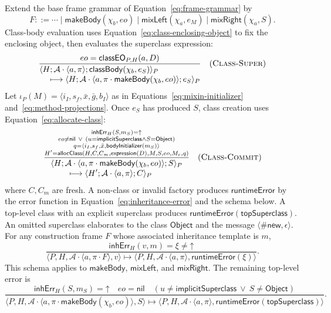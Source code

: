 \documentclass[11pt]{article}
\numberwithin{equation}{section}
\newcommand{\kw}[1]{\ensuremath{\mathsf{#1}}}
\newcommand{\undef}{\mathord{\uparrow}}
\newcommand{\nil}{\kw{nil}}
\newcommand{\Object}{\kw{Object}}
\newcommand{\rulelabel}[1]{\textsc{#1}}
\begin{document}
Extend the base frame grammar of Equation~\eqref{eq:frame-grammar} by
\begin{equation}\label{eq:class-construction-frames}
 F ::= \cdots\mid\kw{makeBody}(\chi_b,eo)
       \mid\kw{mixLeft}(\chi_a,e_M)
       \mid\kw{mixRight}(\chi_a,S).
\end{equation}
Class-body evaluation uses Equation~\eqref{eq:class-enclosing-object} to fix the
enclosing object, then evaluates the superclass expression:
\[
\dfrac{eo=\mathsf{classEO}_{P,H}(a,D)}
 {\begin{aligned}
  &\langle H;\mathcal A\cdot\langle a,\pi\rangle;
       \kw{classBody}(\chi_b,e_S)\rangle_P\\[-1mm]
  &\quad\longmapsto
   \langle H;\mathcal A\cdot\langle a,
       \pi\cdot\kw{makeBody}(\chi_b,eo)\rangle;e_S\rangle_P
 \end{aligned}}
\quad(\rulelabel{Class-Super})
\]
Let $\iota_P(M)=\langle i_I,s_f,\bar x,\bar g,b_I\rangle$ as in
Equations~\eqref{eq:mixin-initializer} and~\eqref{eq:method-projections}.  Once $e_S$
has produced $S$, class creation uses Equation~\eqref{eq:allocate-class}:
\[
\dfrac{\substack{\mathsf{inhErr}_H(S,m_S)=\undef\\
       eo\ne\nil\ \lor\ (u=\kw{implicitSuperclass}\land S=\Object)\\
       q=\langle i_I,s_f,\bar x,\kw{bodyInitializer}(m_S)\rangle\\
       H'=\mathsf{allocClass}(H,C,C_m,\kw{expression}(D),M,S,eo,M_c,q)}}
 {\begin{aligned}
  &\langle H;\mathcal A\cdot\langle a,
       \pi\cdot\kw{makeBody}(\chi_b,eo)\rangle;S\rangle_P\\[-1mm]
  &\qquad\longmapsto
   \langle H';\mathcal A\cdot\langle a,\pi\rangle;C\rangle_P
 \end{aligned}}
\quad(\rulelabel{Class-Commit})
\]
where $C,C_m$ are fresh.  A non-class or invalid factory produces
$\kw{runtimeError}$ by the error function in
Equation~\eqref{eq:inheritance-error} and the schema below.  A top-level class with an
explicit superclass produces $\kw{runtimeError}(\kw{topSuperclass})$.
An omitted superclass elaborates to the class \Object{} and the message
$\langle\#\kw{new},\epsilon\rangle$.
For any construction frame $F$ whose associated inheritance template is $m$,
\begin{equation}\label{eq:inheritance-error-step}
\dfrac{\mathsf{inhErr}_H(v,m)=\xi\ne\undef}
 {\langle P,H,\mathcal A\cdot\langle a,\pi\cdot F\rangle,v\rangle
  \longmapsto
  \langle P,H,\mathcal A\cdot\langle a,\pi\rangle,
       \kw{runtimeError}(\xi)\rangle}.
\end{equation}
This schema applies to \kw{makeBody}, \kw{mixLeft}, and \kw{mixRight}.  The
remaining top-level error is
\begin{equation}\label{eq:top-superclass-error}
\dfrac{\mathsf{inhErr}_H(S,m_S)=\undef\quad eo=\nil\quad
       (u\ne\kw{implicitSuperclass}\ \lor\ S\ne\Object)}
 {\langle P,H,\mathcal A\cdot\langle a,
    \pi\cdot\kw{makeBody}(\chi_b,eo)\rangle,S\rangle
  \longmapsto
  \langle P,H,\mathcal A\cdot\langle a,\pi\rangle,
       \kw{runtimeError}(\kw{topSuperclass})\rangle}.
\end{equation}
\end{document}
